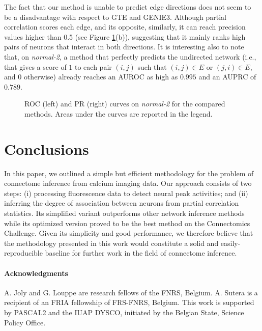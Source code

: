\documentclass[wcp]{jmlr}
\begin{document}
The fact that our method is unable to predict edge directions does not seem to
be a disadvantage with respect to GTE and GENIE3. Although partial correlation
scores each edge, and its opposite, similarly, it can reach precision values
higher than 0.5 (see Figure \ref{fig:curves}(b)), suggesting that it mainly ranks high
pairs of neurons that interact in both directions.  It is interesting also to
note that, on \textit{normal-2}, a method that perfectly predicts the
undirected network (i.e., that gives a score of $1$ to each pair $(i,j)$ such that
$(i,j)\in E$ or $(j,i)\in E$, and $0$ otherwise) already reaches an AUROC as high
as $0.995$ and an AUPRC of $0.789$.
\begin{figure}[t]
\centering
{}
\caption{ROC (left) and PR (right) curves on \textit{normal-2} for the compared methods. Areas under the curves are reported in the legend.}
\label{fig:curves}
\end{figure}

\section{Conclusions} \label{sec:conclusion}

In this paper, we outlined a simple but efficient methodology for the problem
of connectome inference from calcium imaging data. Our approach consists of two
steps: (i) processing fluorescence data to detect neural peak activities; and
(ii) inferring the degree of association between neurons from partial
correlation statistics. Its simplified variant outperforms other
network inference methods while its optimized version proved to be the best method
on the Connectomics Challenge. Given its simplicity and good performance, we
therefore believe that the methodology presented in this work
would constitute a solid and easily-reproducible baseline for further work in
the field of connectome inference.

\paragraph{Acknowledgments}
A. Joly and G. Louppe are research fellows of the FNRS, Belgium.  A. Sutera is a
recipient of an FRIA fellowship of FRS-FNRS, Belgium. This work is supported by
PASCAL2 and the IUAP DYSCO, initiated by the Belgian State, Science Policy
Office.
\end{document}
